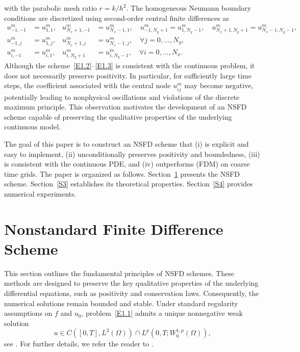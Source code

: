 \documentclass[final,12pt,3p]{elsarticle}
\theoremstyle{plain}
\theoremstyle{definition}
\theoremstyle{remark}
\begin{document}
with the parabolic mesh ratio $r=k/h^2$.
The homogeneous Neumann boundary conditions are discretized using second-order central finite differences as
\begin{equation}\label{E1.3}
\begin{aligned}
  u_{-1,-1}^{m} &= u_{1,1}^{m}, & u_{N_x+1,-1}^{m} &= u_{N_x-1,1}^{m}, \quad u_{-1,N_y+1}^{m} = u_{1,N_y-1}^{m}, \quad u_{N_x+1,N_y+1}^{m} = u_{N_x-1,N_y-1}^{m},\\
   u_{-1,j}^{m} &= u_{1,j}^{m}, & u_{N_x+1,j}^{m} &= u_{N_x-1,j}^{m}, \quad \forall j=0,\ldots,N_y,\\
  u_{i,-1}^{m} &= u_{i,1}^{m}, & u_{i,N_y+1}^{m} &= u_{i,N_y-1}^{m}, \quad \forall i=0,\ldots,N_x.
\end{aligned}
\end{equation}
Although the scheme~\eqref{E1.2}--\eqref{E1.3} is consistent with the continuous problem, it does not necessarily preserve positivity. 
In particular, for sufficiently large time steps, the coefficient associated with the central node $u_{ij}^m$ may become negative, potentially leading to nonphysical oscillations and violations of the discrete maximum principle. 
This observation motivates the development of an NSFD scheme capable of preserving the qualitative properties of the underlying continuous model.

The goal of this paper is to construct an NSFD scheme that 
(i) is explicit and easy to implement, 
(ii) unconditionally preserves positivity and boundedness, 
(iii) is consistent with the continuous PDE, and 
(iv) outperforms (FDM) on coarse time grids. 
The paper is organized as follows. 
Section~\ref{S2} presents the NSFD scheme. 
Section~\ref{S3} establishes its theoretical properties. 
Section~\ref{S4} provides numerical experiments.



\section{Nonstandard Finite Difference Scheme}\label{S2}

This section outlines the fundamental principles of NSFD schemes. These methods are designed to preserve the key qualitative properties of the underlying differential equations, such as positivity and conservation laws. 
Consequently, the numerical solutions remain bounded and stable.
%
Under standard regularity assumptions on $f$ and $u_0$, problem~\eqref{E1.1} admits a unique nonnegative weak solution
\begin{equation*}
    u\in C([0,T],L^2(\Omega)) \cap L^p(0,T;W_0^{1,p}(\Omega)),
\end{equation*}
see \cite[pp.~5--7]{Geredeli2014}. 
For further details, we refer the reader to \cite{Brezis2011}.
\end{document}
